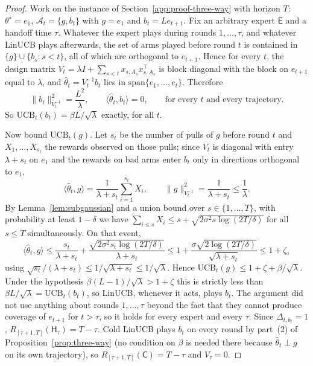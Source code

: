 \documentclass{article}
\theoremstyle{definition}
\theoremstyle{remark}
\theoremstyle{remark}
\newcommand{\Cold}{\mathsf{C}}
\newcommand{\Exp}{\mathsf{E}}
\newcommand{\Hyb}{\mathsf{H}}
\begin{document}
\begin{proof}
Work on the instance of Section~\ref{app:proof-three-way} with horizon $T$:
$\theta^\star=e_1$, $\mathcal A_t=\{g,b_t\}$ with $g=e_1$ and
$b_t=Le_{t+1}$. Fix an arbitrary expert $\Exp$ and a handoff time $\tau$.
Whatever the expert plays during rounds $1,\dots,\tau$, and whatever LinUCB
plays afterwards, the set of arms played before round $t$ is contained in
$\{g\}\cup\{b_s:s<t\}$, all of which are orthogonal to $e_{t+1}$. Hence for
every $t$, the design matrix $V_t=\lambda I+\sum_{s<t}x_{s,A_s}x_{s,A_s}^\top$
is block diagonal with the block on $e_{t+1}$ equal to $\lambda$, and
$\widehat\theta_t=V_t^{-1}b_t$ lies in $\mathrm{span}\{e_1,\dots,e_t\}$. Therefore
\[
\|b_t\|_{V_t^{-1}}^2=\frac{L^2}{\lambda},\qquad \langle\widehat\theta_t,b_t\rangle=0,
\qquad\text{for every }t\text{ and every trajectory.}
\]
So $\mathrm{UCB}_t(b_t)=\beta L/\sqrt\lambda$ exactly, for all $t$.

Now bound $\mathrm{UCB}_t(g)$. Let $s_t$ be the number of pulls of $g$ before
round $t$ and $X_1,\dots,X_{s_t}$ the rewards observed on those pulls; since
$V_t$ is diagonal with entry $\lambda+s_t$ on $e_1$ and the rewards on bad
arms enter $b_t$ only in directions orthogonal to $e_1$,
\[
\langle\widehat\theta_t,g\rangle=\frac{1}{\lambda+s_t}\sum_{i=1}^{s_t}X_i,
\qquad
\|g\|_{V_t^{-1}}^2=\frac{1}{\lambda+s_t}\le\frac1\lambda .
\]
By Lemma~\ref{lem:subgaussian} and a union bound over $s\in\{1,\dots,T\}$,
with probability at least $1-\delta$ we have
$\sum_{i\le s}X_i\le s+\sqrt{2\sigma^2s\log(2T/\delta)}$ for all $s\le T$
simultaneously. On that event,
\[
\langle\widehat\theta_t,g\rangle
\le\frac{s_t}{\lambda+s_t}+\frac{\sqrt{2\sigma^2s_t\log(2T/\delta)}}{\lambda+s_t}
\le 1+\frac{\sigma\sqrt{2\log(2T/\delta)}}{\sqrt{\lambda+s_t}}
\le 1+\zeta ,
\]
using $\sqrt{s_t}/(\lambda+s_t)\le1/\sqrt{\lambda+s_t}\le1/\sqrt\lambda$.
Hence $\mathrm{UCB}_t(g)\le1+\zeta+\beta/\sqrt\lambda$. Under the hypothesis
$\beta(L-1)/\sqrt\lambda>1+\zeta$ this is strictly less than
$\beta L/\sqrt\lambda=\mathrm{UCB}_t(b_t)$, so LinUCB, whenever it acts, plays
$b_t$. The argument did not use anything about rounds $1,\dots,\tau$ beyond
the fact that they cannot produce coverage of $e_{t+1}$ for $t>\tau$, so it
holds for every expert and every $\tau$. Since $\Delta_{t,b_t}=1$,
$R_{[\tau+1,T]}(\Hyb_\tau)=T-\tau$. Cold LinUCB plays $b_t$ on every round by
part~(2) of Proposition~\ref{prop:three-way} (no condition on $\beta$ is
needed there because $\widehat\theta_t\perp g$ on its own trajectory), so
$R_{[\tau+1,T]}(\Cold)=T-\tau$ and $V_\tau=0$.
\end{proof}
\end{document}
